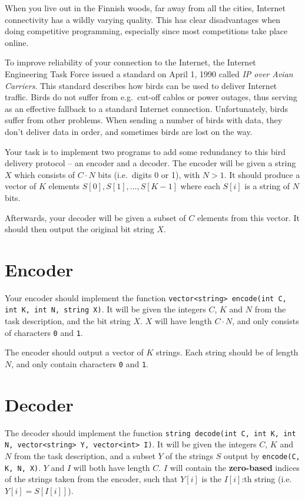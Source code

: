 \def\version{1}
When you live out in the Finnish woods, far away from all the cities, Internet connectivity has a wildly varying quality.
This has clear disadvantages when doing competitive programming, especially since most competitions take place online.

To improve reliability of your connection to the Internet, the Internet Engineering Task Force issued a standard on April 1, 1990 called \emph{IP over Avian Carriers}.
This standard describes how birds can be used to deliver Internet traffic.
Birds do not suffer from e.g.\ cut-off cables or power outages, thus serving as an effective fallback to a standard Internet connection.
Unfortunately, birds suffer from other problems.
When sending a number of birds with data, they don't deliver data in order, and sometimes birds are lost on the way.

Your task is to implement two programs to add some redundancy to this bird delivery protocol -- an encoder and a decoder.
The encoder will be given a string $X$ which consists of $C \cdot N$ bits (i.e.\ digits 0 or 1), with $N > 1$.
It should produce a vector of $K$ elements $S[0], S[1], \dots, S[K - 1]$ where each $S[i]$ is a string of $N$ bits.

Afterwards, your decoder will be given a subset of $C$ elements from this vector.
It should then output the original bit string $X$.

\section*{Encoder}
Your encoder should implement the function \texttt{vector<string> encode(int C, int K, int N, string X)}.
It will be given the integers $C$, $K$ and $N$ from the task description, and the bit string $X$.
$X$ will have length $C \cdot N$, and only consists of characters \texttt{0} and \texttt{1}.

The encoder should output a vector of $K$ strings.
Each string should be of length $N$, and only contain characters \texttt{0} and \texttt{1}.

\section*{Decoder}
The decoder should implement the function \texttt{string decode(int C, int K, int N, vector<string> Y, vector<int> I)}.
It will be given the integers $C$, $K$ and $N$ from the task description, and a subset $Y$ of the strings $S$ output by \texttt{encode(C, K, N, X)}.
$Y$ and $I$ will both have length $C$.
$I$ will contain the \textbf{zero-based} indices of the strings taken from the encoder, such that $Y[i]$ is the $I[i]$:th string (i.e. $Y[i] = S[I[i]]$).

